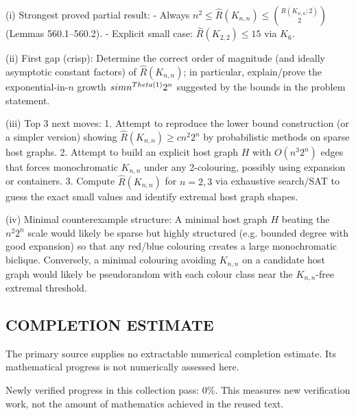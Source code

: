 (i) Strongest proved partial result:
- Always $n^2\le \hat R(K_{n,n})\le \binom{R(K_{n,n};2)}{2}$ (Lemmas 560.1–560.2).
- Explicit small case: $\hat R(K_{2,2})\le 15$ via $K_6$.

(ii) First gap (crisp):
Determine the correct order of magnitude (and ideally asymptotic constant factors) of $\hat R(K_{n,n})$; in particular, explain/prove the exponential-in-$n$ growth $\\sim n^{\\Theta(1)}2^n$ suggested by the bounds in the problem statement.

(iii) Top 3 next moves:
1. Attempt to reproduce the lower bound construction (or a simpler version) showing $\hat R(K_{n,n})\ge c n^2 2^n$ by probabilistic methods on sparse host graphs.
2. Attempt to build an explicit host graph $H$ with $O(n^3 2^n)$ edges that forces monochromatic $K_{n,n}$ under any 2-colouring, possibly using expansion or containers.
3. Compute $\hat R(K_{n,n})$ for $n=2,3$ via exhaustive search/SAT to guess the exact small values and identify extremal host graph shapes.

(iv) Minimal counterexample structure:
A minimal host graph $H$ beating the $n^2 2^n$ scale would likely be sparse but highly structured (e.g. bounded degree with good expansion) so that any red/blue colouring creates a large monochromatic biclique. Conversely, a minimal colouring avoiding $K_{n,n}$ on a candidate host graph would likely be pseudorandom with each colour class near the $K_{n,n}$-free extremal threshold.



\subsection*{COMPLETION ESTIMATE}
The primary source supplies no extractable numerical completion estimate. Its mathematical progress is not numerically assessed here.

Newly verified progress in this collection pass: $0\%$. This measures new verification work, not the amount of mathematics achieved in the reused text.

